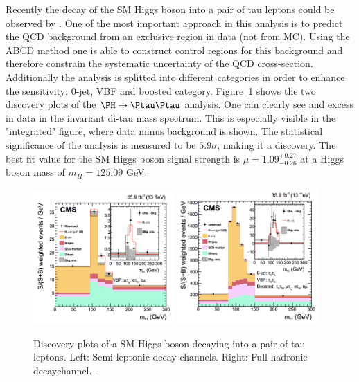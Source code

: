 Recently the decay of the SM Higgs boson into a pair of tau leptons could be observed by \CMS. One of the most important approach in this analysis is to predict the QCD background from an exclusive
region in data (not from MC). Using the ABCD method one is able to construct control regions for this background and therefore constrain
the systematic uncertainty of the QCD cross-section. Additionally the analysis is splitted into different categories in order to enhance the sensitivity: 0-jet, VBF and boosted category.
Figure~\ref{figure_higgs_discovery_HTT} shows the two discovery plots of the
$\PH \rightarrow \Ptau \Ptau$ analysis. One can clearly see and excess in data in the invariant di-tau mass spectrum. This is especially visible in the "integrated" figure, where
data minus background is shown. The statistical significance of the analysis is measured to be $5.9\sigma$, making it a discovery. The best fit value for the SM Higgs boson
signal strength is $\mu = 1.09_{-0.26}^{+0.27}$ at a Higgs boson mass of $m_{H} = 125.09$ GeV.

\begin{figure}[h]
\includegraphics[width=0.48\textwidth]{../plots/higgstautau_otherchannel.png}
\hfill
\includegraphics[width=0.48\textwidth]{../plots/higgstautau.png}
\caption[Higgs boson discovery $\PH \rightarrow \Ptau \Ptau$.]{Discovery plots of a SM Higgs boson decaying into a pair of tau leptons. Left: Semi-leptonic decay channels. Right: Full-hadronic decaychannel.~\cite{HTT_discovery}.}
\label{figure_higgs_discovery_HTT}
\end{figure}
